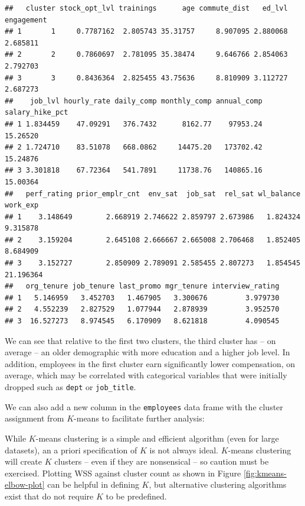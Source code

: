 \documentclass[
]{book}
\newenvironment{Shaded}{\begin{snugshade}}{\end{snugshade}}
\newcommand{\AttributeTok}[1]{\textcolor[rgb]{0.77,0.63,0.00}{#1}}
\newcommand{\CommentTok}[1]{\textcolor[rgb]{0.56,0.35,0.01}{\textit{#1}}}
\newcommand{\FunctionTok}[1]{\textcolor[rgb]{0.00,0.00,0.00}{#1}}
\newcommand{\NormalTok}[1]{#1}
\newcommand{\OtherTok}[1]{\textcolor[rgb]{0.56,0.35,0.01}{#1}}
\newcommand{\SpecialCharTok}[1]{\textcolor[rgb]{0.00,0.00,0.00}{#1}}
\begin{document}
\begin{verbatim}
##   cluster stock_opt_lvl trainings      age commute_dist   ed_lvl engagement
## 1       1     0.7787162  2.805743 35.31757     8.907095 2.880068   2.685811
## 2       2     0.7860697  2.781095 35.38474     9.646766 2.854063   2.792703
## 3       3     0.8436364  2.825455 43.75636     8.810909 3.112727   2.687273
##    job_lvl hourly_rate daily_comp monthly_comp annual_comp salary_hike_pct
## 1 1.834459    47.09291   376.7432      8162.77    97953.24        15.26520
## 2 1.724710    83.51078   668.0862     14475.20   173702.42        15.24876
## 3 3.301818    67.72364   541.7891     11738.76   140865.16        15.00364
##   perf_rating prior_emplr_cnt  env_sat  job_sat  rel_sat wl_balance  work_exp
## 1    3.148649        2.668919 2.746622 2.859797 2.673986   1.824324  9.315878
## 2    3.159204        2.645108 2.666667 2.665008 2.706468   1.852405  8.684909
## 3    3.152727        2.850909 2.789091 2.585455 2.807273   1.854545 21.196364
##   org_tenure job_tenure last_promo mgr_tenure interview_rating
## 1   5.146959   3.452703   1.467905   3.300676         3.979730
## 2   4.552239   2.827529   1.077944   2.878939         3.952570
## 3  16.527273   8.974545   6.170909   8.621818         4.090545
\end{verbatim}

We can see that relative to the first two clusters, the third cluster has -- on average -- an older demographic with more education and a higher job level. In addition, employees in the first cluster earn significantly lower compensation, on average, which may be correlated with categorical variables that were initially dropped such as \texttt{dept} or \texttt{job\_title}.

We can also add a new column in the \texttt{employees} data frame with the cluster assignment from \(K\)-means to facilitate further analysis:

\begin{Shaded}
\end{Shaded}

While \(K\)-means clustering is a simple and efficient algorithm (even for large datasets), an a priori specification of \(K\) is not always ideal. \(K\)-means clustering will create \(K\) clusters -- even if they are nonsensical -- so caution must be exercised. Plotting WSS against cluster count as shown in Figure \ref{fig:kmeans-elbow-plot} can be helpful in defining \(K\), but alternative clustering algorithms exist that do not require \(K\) to be predefined.
\end{document}
